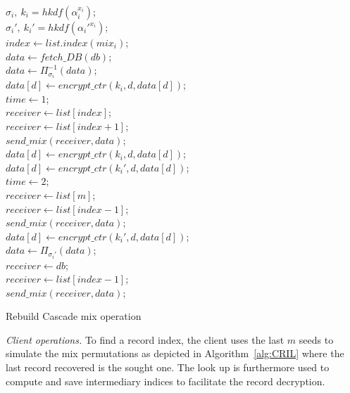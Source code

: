 \documentclass[USenglish,oneside,twocolumn]{article}
\begin{document}
\begin{algorithm}
\DontPrintSemicolon
{}
$\sigma_{i},\ k_{i}=hkdf(\alpha_{i}^{x_i})$;\\
$\sigma_{i}',\ k_{i}'=hkdf(\alpha_{i}'^{x_i})$;\\
$index \gets list.index(mix_i)$;\\
{
{
$data \gets fetch\_DB(db)$;\\
}
$data \gets \Pi_{\sigma_{i}}^{-1}(data)$;\\
{
	$data[d] \gets encrypt\_ctr(k_{i}, d, data[d])$;\\
}
$time \gets 1$;\\
$receiver \gets list[index]$;\\
{
$receiver \gets list[index+1]$;\\
}
$send\_mix(receiver, data)$;\\
}
{
{
	$data[d] \gets encrypt\_ctr(k_{i}, d, data[d])$;\\
    $data[d] \gets encrypt\_ctr(k_{i}', d, data[d])$;\\
}
$time \gets 2$;\\
$receiver \gets list[m]$;\\
{
$receiver \gets list[index-1]$;\\
}
$send\_mix(receiver, data)$;\\
}
\Else
{
{
$data[d] \gets encrypt\_ctr(k_{i}', d, data[d])$;\\
}
$data \gets \Pi_{\sigma_{i}'}(data)$;\\
$receiver \gets db$;\\
{
$receiver \gets list[index-1]$;\\
}
$send\_mix(receiver, data)$;\\
}
\caption{Rebuild Cascade mix operation}
\label{alg:RCmix}
\end{algorithm}

\noindent\textit{Client operations.} To find a record index, the client uses the last $m$ seeds to simulate the mix permutations as depicted in Algorithm~\ref{alg:CRIL} where the last record recovered is the sought one. The look up is furthermore used to compute and save intermediary indices to facilitate the record decryption. 
\end{document}
